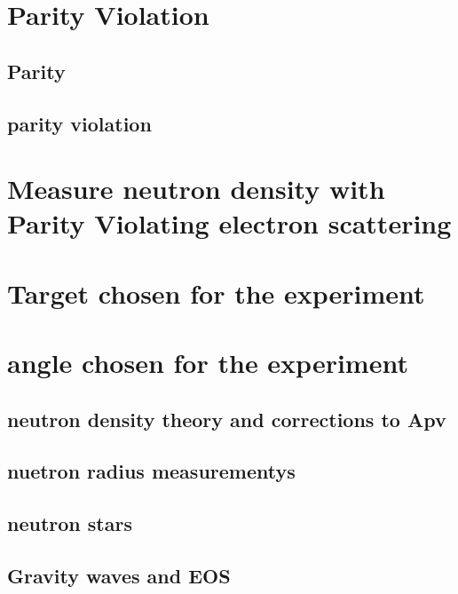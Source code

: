 \section{Parity Violation}
\subsection{Parity}

\subsection{parity violation}

\section{Measure neutron density with Parity Violating electron scattering}

\section{Target chosen for the experiment}
\section{angle chosen for the experiment}


\subsection{neutron density theory and corrections to Apv}
\subsection{nuetron radius measurementys}
\subsection{neutron stars}
\subsection{Gravity waves and EOS}


